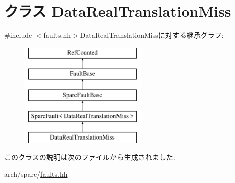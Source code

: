 \hypertarget{classSparcISA_1_1DataRealTranslationMiss}{
\section{クラス DataRealTranslationMiss}
\label{classSparcISA_1_1DataRealTranslationMiss}
}


{\ttfamily \#include $<$faults.hh$>$}DataRealTranslationMissに対する継承グラフ:\begin{figure}[H]
\begin{center}
\leavevmode
\includegraphics[height=5cm]{classSparcISA_1_1DataRealTranslationMiss}
\end{center}
\end{figure}


このクラスの説明は次のファイルから生成されました:\begin{DoxyCompactItemize}
\item 
arch/sparc/\hyperlink{arch_2sparc_2faults_8hh}{faults.hh}\end{DoxyCompactItemize}
